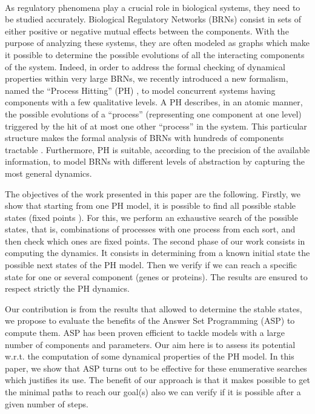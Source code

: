  \\
As regulatory phenomena play a crucial role in biological systems, they need to
be studied accurately. Biological Regulatory Networks (BRNs) consist in sets
of either positive or negative mutual effects between the components. With the
purpose of analyzing these systems, they are often modeled as graphs which make
it possible to determine the possible evolutions of all the interacting components of the system. Indeed, in order to address the formal checking of dynamical properties within very large BRNs, we recently introduced a new formalism, named the “Process Hitting” (PH) \cite{pauleve2011modelisation}, to model concurrent systems having components with a few qualitative levels. A PH describes, in an atomic manner, the possible evolutions of a “process” (representing one component at one level) triggered by the hit of at most one other “process” in the system. This particular structure makes the formal analysis of BRNs with hundreds of components tractable . Furthermore, PH is suitable, according to the precision of the available information, to model BRNs with different levels of abstraction by capturing the most general dynamics.

The objectives of the work presented in this paper are the following.
Firstly, we show that starting from one PH model, it is possible to find all possible stable states (fixed points \cite{wuensche1998genomic} ).
For this, we perform an exhaustive search of the possible states, that is, combinations of processes with one process from each sort, and then check which ones are fixed points.
The second phase of our work consists in computing the dynamics. It consists in determining from a known initial state the possible next states of the PH model. Then we verify if we can reach a specific state for one or several component (genes or proteins). The results are ensured to respect strictly the PH dynamics.

Our contribution is from the results that allowed to determine the stable states, we propose to evaluate the benefits of the Answer Set Programming (ASP) \cite{baral2003knowledge} to compute them. ASP has been proven efficient to tackle models with a large number of components and parameters. Our aim here is to assess its potential w.r.t. the computation of some dynamical properties of the PH model. In this paper, we show that ASP turns out to be effective for these enumerative searches which justifies its use. The benefit of our approach is that it makes possible to get the minimal paths to reach our goal(s) also we can verify if it is possible after a given number of steps. %

